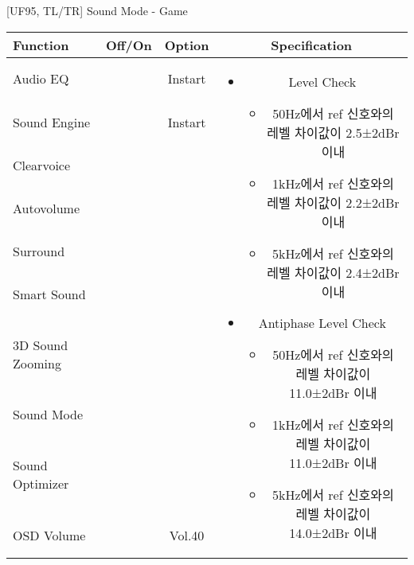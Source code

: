 \begin{frame}[t]{[UF95, TL/TR] Sound Mode - Game}
\begin{tiny}
\begin{tabular}{@{}lccc@{}}
\toprule
Function & Off/On & Option & Specification \\
\midrule
Audio EQ & \color{black}{Off} & Instart &
\multirow{10}{60mm}{
\begin{itemize}
\item Level Check
  \begin{itemize}
  \item 50Hz에서 ref 신호와의 레벨 차이값이 2.5±2dBr 이내
  \item 1kHz에서 ref 신호와의 레벨 차이값이 2.2±2dBr 이내
  \item 5kHz에서 ref 신호와의 레벨 차이값이 2.4±2dBr 이내
  \end{itemize}
\item Antiphase Level Check
  \begin{itemize}
  \item 50Hz에서 ref 신호와의 레벨 차이값이 11.0±2dBr 이내
  \item 1kHz에서 ref 신호와의 레벨 차이값이 11.0±2dBr 이내
  \item 5kHz에서 ref 신호와의 레벨 차이값이 14.0±2dBr 이내
  \end{itemize}
\end{itemize}
} \\
Sound Engine & \color{blue}{On} & Instart & \\
Clearvoice & \color{black}{Off} & & \\
Autovolume & \color{black}{Off} & & \\
Surround & \color{black}{Off} & & \\
Smart Sound & \color{black}{Off} & & \\
3D Sound Zooming & \color{black}{Off} & & \\
Sound Mode & \color{blue}{On} & \color{blue}{Game} & \\
Sound Optimizer & \color{black}{Off} & & \\
OSD Volume & \color{blue}{On} & Vol.40 & \\
\midrule
\end{tabular}
\end{tiny}

\end{frame}

